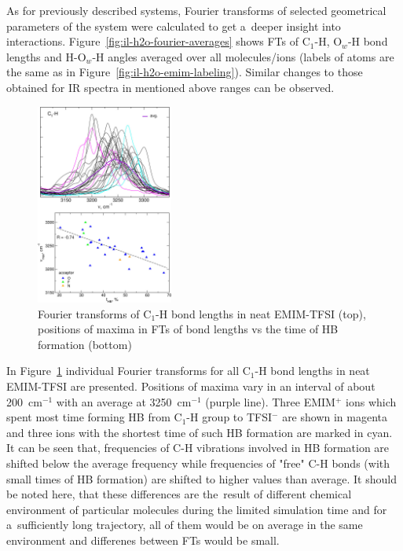 As for previously described systems, Fourier transforms of selected geometrical parameters of the system were calculated to get a~deeper insight into interactions. Figure~\ref{fig:il-h2o-fourier-averages} shows FTs of C$_1$-H, O$_w$-H bond lengths and H-O$_w$-H angles averaged over all molecules/ions (labels of atoms are the same as in Figure~\ref{fig:il-h2o-emim-labeling}). Similar changes to those obtained for IR spectra in mentioned above ranges can be observed.

\begin{figure}[ht]
    \centering
    \includegraphics[width=0.4\textwidth]{img/4-ir-spectra-from-aimd-simulations/4-il-h2o/c-h-corr-0.png}
    \caption{Fourier transforms of C$_1$-H bond lengths in neat EMIM-TFSI (top), positions of maxima in FTs of bond lengths vs the time of HB formation (bottom)}
    \label{fig:il-h2o-c-h-corr-0}
\end{figure}

In Figure~\ref{fig:il-h2o-c-h-corr-0} individual Fourier transforms for all C$_1$-H bond lengths in neat EMIM-TFSI are presented. Positions of maxima vary in an interval of about 200~cm$^{-1}$ with an average at 3250~cm$^{-1}$ (purple line). Three EMIM$^{+}$ ions which spent most time forming HB from C$_1$-H group to TFSI$^{-}$ are shown in magenta and three ions with the shortest time of such HB formation are marked in cyan. It can be seen that, frequencies of C-H vibrations involved in HB formation are shifted below the average frequency while frequencies of "free" C-H bonds (with small times of HB formation) are shifted to higher values than average. It should be noted here, that these differences are the~result of different chemical environment of particular molecules during the limited simulation time and for a~sufficiently long trajectory, all of them would be on average in the same environment and differenes between FTs would be small.


